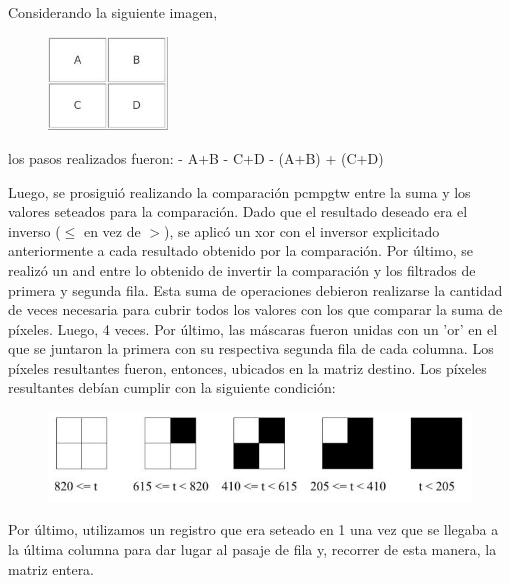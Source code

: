 \documentclass[10pt, a4paper]{article}
\begin{document}
\begin{itemize}
\newline
Considerando la siguiente imagen,
\begin{figure}[H] %
\begin{center}
\includegraphics[width=90pt]{./suma.jpg}
\end{center}
\end{figure}
los pasos realizados fueron:\newline
- A+B\newline
- C+D\newline
- (A+B) + (C+D)\newline

Luego, se prosiguió realizando la comparación pcmpgtw entre la suma y los valores seteados para la comparación. Dado que el resultado deseado era el inverso ($\leq$ en vez de $>$), se aplicó un xor con el inversor explicitado anteriormente a cada resultado obtenido por la comparación. Por último, se realizó un and entre lo obtenido de invertir la comparación y los filtrados de primera y segunda fila. Esta suma de operaciones debieron realizarse la cantidad de veces necesaria para cubrir todos los valores con los que comparar la suma de píxeles. Luego, 4 veces. Por último, las máscaras fueron unidas con un 'or' en el que se juntaron la primera con su respectiva segunda fila de cada columna. Los píxeles resultantes fueron, entonces, ubicados en la matriz destino.\newline
Los píxeles resultantes debían cumplir con la siguiente condición:
\begin{figure}[H] %
\begin{center}
\includegraphics[width=400pt]{./halftone.jpg}
\end{center}
\end{figure}
Por último, utilizamos un registro que era seteado en 1 una vez que se llegaba a la última columna para dar lugar al pasaje de fila y, recorrer de esta manera, la matriz entera.


\end{itemize}
\end{document}
